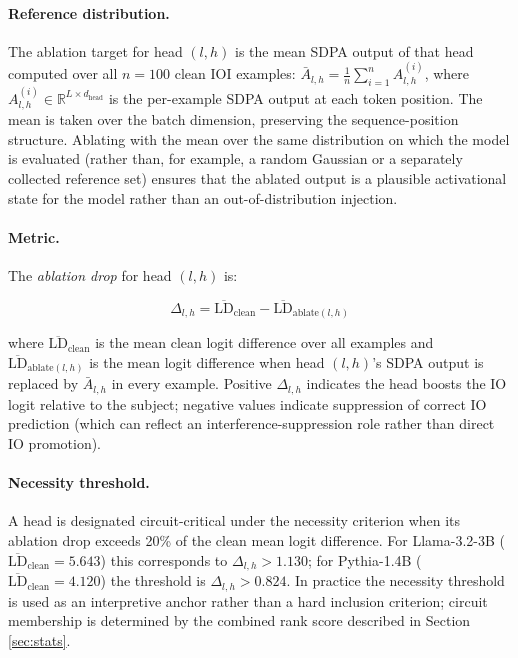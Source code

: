 \documentclass[11pt,a4paper]{article}
\begin{document}
\paragraph{Reference distribution.}
The ablation target for head $(l, h)$ is the mean SDPA output of that head computed
over all $n = 100$ clean IOI examples:
$\bar{A}_{l,h} = \frac{1}{n}\sum_{i=1}^n A_{l,h}^{(i)}$, where
$A_{l,h}^{(i)} \in \mathbb{R}^{L \times d_{\text{head}}}$ is the per-example SDPA
output at each token position. The mean is taken over the batch dimension, preserving
the sequence-position structure. Ablating with the mean over the same distribution on
which the model is evaluated (rather than, for example, a random Gaussian or a
separately collected reference set) ensures that the ablated output is a plausible
activational state for the model rather than an out-of-distribution injection.

\paragraph{Metric.}
The \emph{ablation drop} for head $(l, h)$ is:

\begin{equation}
  \Delta_{l,h} = \overline{\text{LD}}_{\text{clean}} - \overline{\text{LD}}_{\text{ablate}(l,h)}
  \label{eq:ablation}
\end{equation}

where $\overline{\text{LD}}_{\text{clean}}$ is the mean clean logit difference over
all examples and $\overline{\text{LD}}_{\text{ablate}(l,h)}$ is the mean logit
difference when head $(l, h)$'s SDPA output is replaced by $\bar{A}_{l,h}$ in every
example. Positive $\Delta_{l,h}$ indicates the head boosts the IO logit relative to
the subject; negative values indicate suppression of correct IO prediction (which can
reflect an interference-suppression role rather than direct IO promotion).

\paragraph{Necessity threshold.}
A head is designated circuit-critical under the necessity criterion when its ablation
drop exceeds 20\% of the clean mean logit difference. For Llama-3.2-3B
($\overline{\text{LD}}_{\text{clean}} = 5.643$) this corresponds to
$\Delta_{l,h} > 1.130$; for Pythia-1.4B ($\overline{\text{LD}}_{\text{clean}} =
4.120$) the threshold is $\Delta_{l,h} > 0.824$. In practice the necessity threshold
is used as an interpretive anchor rather than a hard inclusion criterion; circuit
membership is determined by the combined rank score described in Section
\ref{sec:stats}.
\end{document}
